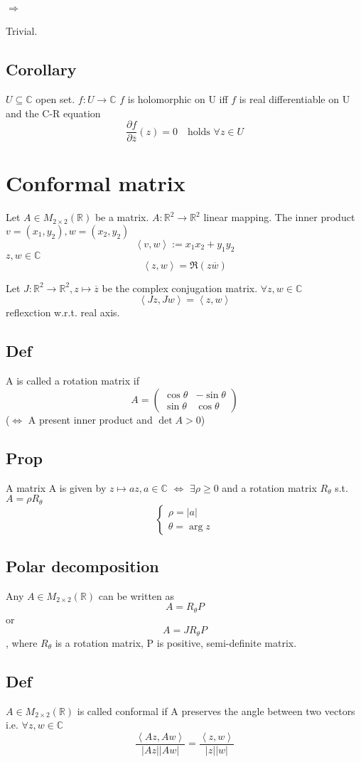 \documentclass{book}
\newcommand{\abs}[1]{\left\lvert #1 \right\rvert}
\newcommand{\inprod}[2]{\left<#1,#2\right>}
\begin{document}
\subsubsection{$\Rightarrow$}Trivial.
\section{Corollary}
$U\subseteq \mathbb C$ open set. $f:U\rightarrow \mathbb C$ $f$ is holomorphic on U iff $f$ is real differentiable on U and the C-R equation $$\frac{\partial f}{\partial \overline z}(z)=0\quad\text{holds }\forall z\in U$$
\chapter{Conformal matrix}
Let $A\in M_{2\times 2}(\mathbb R)$ be a matrix. $A:\mathbb R^2\rightarrow \mathbb R^2$ linear mapping. The inner product $v=(x_1,y_2),w=(x_2,y_2)$$$\inprod{v}{w}:=x_1x_2+y_1y_2$$$z,w\in \mathbb C$$$\inprod{z}{w}=\Re(z\overline w)$$

Let $J:\mathbb R^2\rightarrow\mathbb R^2, z\mapsto \overline z$ be the complex conjugation matrix. $\forall z,w\in \mathbb C$$$\inprod{Jz}{Jw}=\inprod{z}w$$
reflexction w.r.t. real axis.
\section{Def}A is called a rotation matrix if $$A=\begin{pmatrix}
    \cos\theta &-\sin\theta\\\sin\theta&\cos\theta
\end{pmatrix}$$
($\Leftrightarrow$ A present inner product and $\det A>0$)
\section{Prop}
A matrix A is given by $z\mapsto az,a\in \mathbb C$ $\Leftrightarrow$ $\exists\rho\geq 0$ and a rotation matrix $R_\theta$ s.t. $A=\rho R_\theta$$$\begin{cases}
    \rho=\abs{a}\\\theta=\arg z
\end{cases}$$
\section{Polar decomposition}
Any $A\in M_{2\times 2}(\mathbb R)$ can be written as $$A= R_\theta P$$or $$A=JR_\theta P$$, where $R_\theta$ is a rotation matrix, P is positive, semi-definite matrix.
\section{Def}
$A\in M_{2\times 2}(\mathbb R)$ is called conformal if A preserves the angle between two vectors i.e. $\forall z,w\in \mathbb C$$$\frac{\inprod{Az}{Aw}}{\abs{Az}\abs{Aw}}=\frac{\inprod{z}w}{\abs{z}\abs{w}} $$
\end{document}
